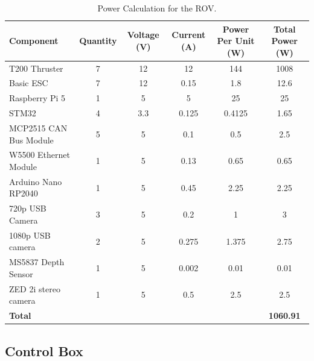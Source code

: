 \documentclass[11pt, twocolumn]{article}
\begin{document}
\begin{table}[b]
    \centering
    \begin{adjustbox}{max width=0.95\textwidth}
    \begin{tabular}{@{} l *{5}{c} @{}}
      \toprule
      \textbf{Component} & \textbf{Quantity} & \textbf{Voltage (V)} & \textbf{Current (A)} & \textbf{Power Per Unit (W)} & \textbf{Total Power (W)} \\
      \midrule
      T200 Thruster            & 7 & 12   & 12     & 144    & 1008   \\
      Basic ESC                & 7 & 12   & 0.15   & 1.8    & 12.6   \\
      Raspberry Pi 5           & 1 & 5    & 5      & 25     & 25     \\
      STM32                    & 4 & 3.3  & 0.125  & 0.4125 & 1.65   \\
      MCP2515 CAN Bus Module   & 5 & 5    & 0.1    & 0.5    & 2.5    \\
      W5500 Ethernet Module    & 1 & 5    & 0.13   & 0.65   & 0.65   \\
      Arduino Nano RP2040      & 1 & 5    & 0.45   & 2.25   & 2.25   \\
      720p USB Camera          & 3 & 5    & 0.2    & 1      & 3      \\
      1080p USB camera         & 2 & 5    & 0.275  & 1.375  & 2.75   \\
      MS5837 Depth Sensor      & 1 & 5    & 0.002  & 0.01   & 0.01   \\
      ZED 2i stereo camera     & 1 & 5    & 0.5    & 2.5    & 2.5    \\
      \midrule
     \multicolumn{5}{l}{\textbf{Total}} & \textbf{1060.91} \\
      \bottomrule
    \end{tabular}
    \end{adjustbox}
\caption{Power Calculation for the ROV.}
\label{tab:rov_power_calculation}
\end{table}

\subsection{Control Box}
\end{document}
